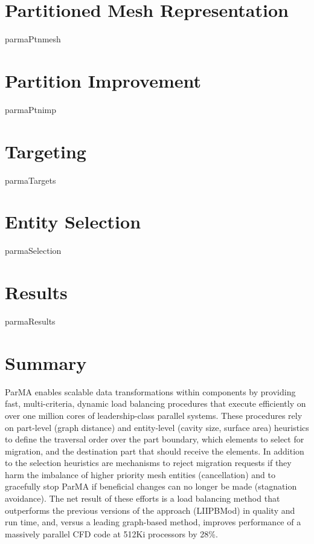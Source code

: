 \section{Partitioned Mesh Representation} \label{sec:pumi}
{parmaPtnmesh}

\section{Partition Improvement} \label{sec:parma}
{parmaPtnimp}

\section{Targeting} \label{sec:targeting}
{parmaTargets}

\section{Entity Selection} \label{sec:entSelection}
{parmaSelection}

\section{Results} \label{sec:results}
{parmaResults}

\section{Summary}
ParMA enables scalable data transformations within components by providing fast,
multi-criteria, dynamic load balancing procedures that execute efficiently on
over one million cores of leadership-class parallel systems.
These procedures rely on part-level (graph distance) and
entity-level (cavity size, surface area) heuristics to define the traversal
order over the part boundary, which elements to select for migration, and the
destination part that should receive the elements.
In addition to the selection heuristics are mechanisms to reject migration
requests if they harm the imbalance of higher priority mesh entities
(cancellation) and to gracefully stop ParMA if beneficial changes can no longer
be made (stagnation avoidance).
The net result of these efforts is a load balancing method that outperforms the
previous versions of the approach (LIIPBMod) in quality and run time, and,
versus a leading graph-based method, improves performance of a massively
parallel CFD code at 512Ki processors by 28\%.
